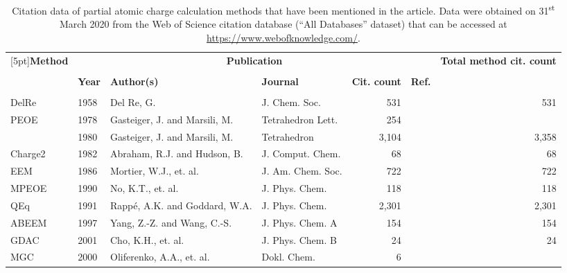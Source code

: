 \documentclass[oneside]{memoir}
\begin{document}
\renewcommand{\bibname}{References}

\begin{table}
\renewcommand{\tablename}{\textbf{Supplementary table}}
\renewcommand\thetable{\textbf{1}}
\caption{Citation data of partial atomic charge calculation methods that have been mentioned in the article. Data were obtained on 31\textsuperscript{st} March 2020 from the Web of Science citation database (“All Databases” dataset) that can be accessed at \href{https://www.webofknowledge.com/}{https://www.webofknowledge.com/}.}
\begin{tabular}{llllrrr}
\toprule
\addlinespace[0.5em]
\multirow{2}{*}[5pt]{\textbf{Method}} & \multicolumn{5}{c}{\textbf{Publication}}                                                    & \multirow{2}{1cm}{\textbf{Total method cit. count}}\\ \\
                                 & \textbf{Year} & \textbf{Author(s)} & \textbf{Journal} & \parbox{1cm}{\textbf{Cit. count}} & \textbf{Ref.} &\\
\\
\midrule
DelRe   & 1958 & Del Re, G.                    & J. Chem. Soc.           &   531 & \cite{DelRe1958} &   531\\
PEOE    & 1978 & Gasteiger, J. and Marsili, M. & Tetrahedron Lett.       &   254 & \cite{Gasteiger1978}   &      \\
        & 1980 & Gasteiger, J. and Marsili, M. & Tetrahedron             & 3,104 & \cite{Gasteiger1980}   & 3,358\\
Charge2 & 1982 & Abraham, R.J. and Hudson, B.  & J. Comput. Chem.        &    68 & \cite{Abraham1982}     &    68\\
EEM     & 1986 & Mortier, W.J., et. al.        & J. Am. Chem. Soc.       &   722 & \cite{Mortier1986}     &   722\\
MPEOE   & 1990 & No, K.T., et. al.             & J. Phys. Chem.          &   118 & \cite{No1990}          &   118\\
QEq     & 1991 & Rappé, A.K. and Goddard, W.A. & J. Phys. Chem.          & 2,301 & \cite{Rappe1991}       & 2,301\\
ABEEM   & 1997 & Yang, Z.-Z. and Wang, C.-S.   & J. Phys. Chem. A        &   154 & \cite{Yang1997}        &   154\\
GDAC    & 2001 & Cho, K.H., et. al.            & J. Phys. Chem. B        &    24 & \cite{Cho2001}         &    24\\
MGC     & 2000 & Oliferenko, A.A., et. al.     & Dokl. Chem.             &     6 & \cite{Oliferenko2000}  &      \\

\end{tabular}
\end{table}
\end{document}
